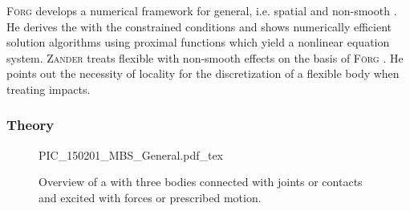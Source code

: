 \textsc{Förg} develops a numerical framework for general, i.e. spatial and non-smooth \MBSs \cite{forg_mehrkorpersysteme_2007}. 
He derives the \EOMs with the constrained conditions and shows numerically efficient solution algorithms using proximal functions which yield a nonlinear equation system.
\textsc{Zander} treats flexible \MBSs with non-smooth effects on the basis of \textsc{Förg} \cite{zander_flexible_2009}.
He points out the necessity of locality for the discretization of a flexible body when treating impacts.

\subsubsection{Theory}

\begin{figure}
\begin{center}
  \def\svgwidth{\textwidth}{PIC_150201_MBS_General.pdf_tex}
  \caption[Overview of a MBS]{Overview of a \MBS with three bodies connected with joints or contacts and excited with forces or prescribed motion.}
  \label{fig:PIC_150201_MBS_General}
\end{center}
\end{figure}

